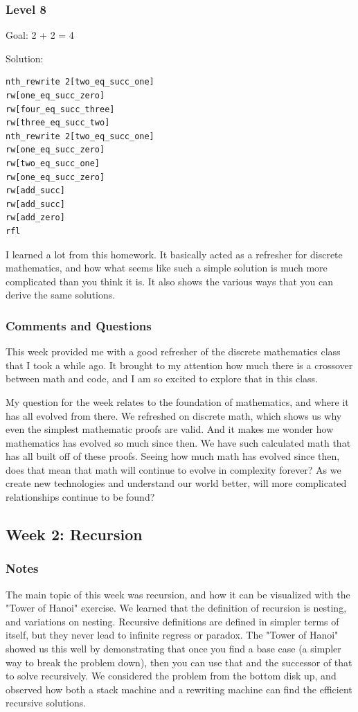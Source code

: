 \documentclass{article}
\theoremstyle{theorem}
\theoremstyle{definition}
\theoremstyle{remark}
\begin{document}
\subsubsection*{Level 8}
Goal: 2 + 2 = 4

Solution:
\begin{lstlisting}
nth_rewrite 2[two_eq_succ_one]
rw[one_eq_succ_zero]
rw[four_eq_succ_three]
rw[three_eq_succ_two]
nth_rewrite 2[two_eq_succ_one]
rw[one_eq_succ_zero]
rw[two_eq_succ_one]
rw[one_eq_succ_zero]
rw[add_succ]
rw[add_succ]
rw[add_zero]
rfl
\end{lstlisting}

I learned a lot from this homework. It basically acted as a refresher for discrete mathematics, and 
how what seems like such a simple solution is much more complicated than you think it is. It also shows 
the various ways that you can derive the same solutions.


\subsubsection*{Comments and Questions}

This week provided me with a good refresher of the discrete mathematics class that I took a while ago. It brought to my attention how much
there is a crossover between math and code, and I am so excited to explore that in this class.

My question for the week relates to the foundation of mathematics, and where it has all evolved from there. We refreshed on discrete math,
which shows us why even the simplest mathematic proofs are valid. And it makes me wonder how mathematics has evolved so much since then. We have
such calculated math that has all built off of these proofs. Seeing how much math has evolved since then, does that mean that math will continue to
evolve in complexity forever? As we create new technologies and understand our world better, will more complicated relationships continue to be found?

\subsection{Week 2: Recursion}
\subsubsection*{Notes}
The main topic of this week was recursion, and how it can be visualized with the "Tower of Hanoi" exercise.
We learned that the definition of recursion is nesting, and variations on nesting. Recursive definitions are
defined in simpler terms of itself, but they never lead to infinite regress or paradox. The "Tower of Hanoi" showed
us this well by demonstrating that once you find a base case (a simpler way to break the problem down), then you can
use that and the successor of that to solve recursively. We considered the problem from the bottom disk up, and observed
how both a stack machine and a rewriting machine can find the efficient recursive solutions.
\end{document}
